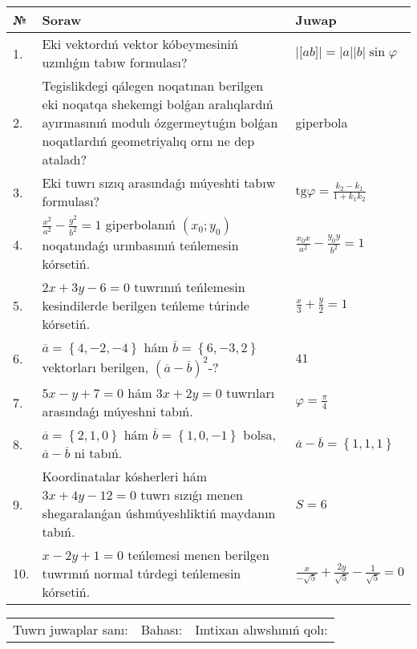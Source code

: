 \documentclass{article}
\begin{document}
\begin{tabular}{|m{0.7cm}|m{10cm}|m{4cm}|}
\hline
№ & Soraw & Juwap \\
\hline
1. & Eki vektordıń vektor kóbeymesiniń uzınlıǵın tabıw formulası? & $\left| \lbrack ab\rbrack \right|=|a||b|\sin\varphi$ \\
\hline
2. & Tegislikdegi qálegen noqatınan berilgen eki noqatqa shekemgi bolǵan aralıqlardıń ayırmasınıń modulı ózgermeytuǵın bolǵan noqatlardıń geometriyalıq ornı ne dep ataladı? & giperbola \\
\hline
3. & Eki tuwrı sızıq arasındaǵı múyeshti tabıw formulası? & $\text{tg}\varphi=\frac{k_2-k_1}{1+k_1k_2}$ \\
\hline
4. & $\frac{x^2}{a^2}-\frac{y^2}{b^2}=1$ giperbolanıń $(x_0;y_0)$ noqatındaǵı urınbasınıń teńlemesin kórsetiń. & $\frac{x_0x}{a^2}-\frac{y_0y}{b^2}=1$ \\
\hline
5. & $2x+3y-6=0$ tuwrınıń teńlemesin kesindilerde berilgen teńleme túrinde kórsetiń. & $\frac{x}{3} + \frac{ y }{ 2 } =  1$ \\
\hline
6. & $\overline{a}=\left\{ 4,-2,-4 \right\}$ hám $\overline{b}=\left\{ 6,-3, 2 \right\}$ vektorları berilgen, $(\overline{a}-\overline{b}) ^{2}$-? & $41$ \\
\hline
7. & $5x-y+7=0$ hám $3x+2y=0$ tuwrıları arasındaǵı múyeshni tabıń. & $\varphi=\frac{\pi}{4}$ \\
\hline
8. & $\overline{a}=\left\{ 2, 1, 0 \right\}$ hám $\overline{b}=\left\{ 1, 0,-1 \right\}$ bolsa, $\overline{a}-\overline{b}$ ni tabıń. & $\overline{a} -\overline{b} = \left\{ 1,1,1 \right\}$ \\
\hline
9. & Koordinatalar kósherleri hám $ 3x+4y-12=0 $ tuwrı sızıǵı menen shegaralanǵan úshmúyeshliktiń maydanın tabıń. & $ S=6 $ \\
\hline
10. & $x-2y+1=0$ teńlemesi menen berilgen tuwrınıń normal túrdegi teńlemesin kórsetiń. & $\frac{x}{- \sqrt{5}}+\frac{2y}{\sqrt{5}}-\frac{1}{\sqrt{5}}=0$ \\
\hline
\end{tabular}

\vspace{1cm}

\begin{tabular}{lll}
Tuwrı juwaplar sanı: \underline{\hspace{1.5cm}} & 
Bahası: \underline{\hspace{1.5cm}} & 
Imtixan alıwshınıń qolı: \underline{\hspace{2cm}} \\
\end{tabular}
\end{document}
